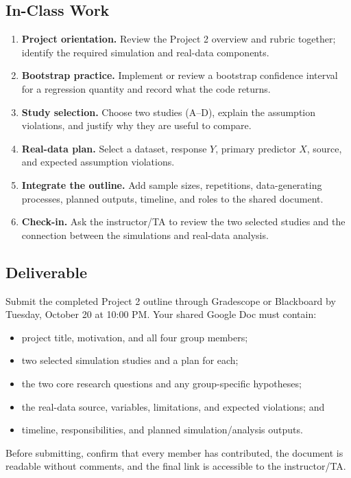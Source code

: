 \documentclass{article}
\newcommand{\submissionplatform}{Gradescope or Blackboard}
\newcommand{\duedate}{Tuesday, October 20 at 10:00 PM}
\begin{document}
\subsection*{In-Class Work}
\begin{enumerate}[label={\bfseries (\Alph*)},itemsep=.5em]
  \item \textbf{Project orientation.} Review the Project 2 overview and rubric together; identify the required simulation and real-data components.
  \item \textbf{Bootstrap practice.} Implement or review a bootstrap confidence interval for a regression quantity and record what the code returns.
  \item \textbf{Study selection.} Choose two studies (A--D), explain the assumption violations, and justify why they are useful to compare.
  \item \textbf{Real-data plan.} Select a dataset, response $Y$, primary predictor $X$, source, and expected assumption violations.
  \item \textbf{Integrate the outline.} Add sample sizes, repetitions, data-generating processes, planned outputs, timeline, and roles to the shared document.
  \item \textbf{Check-in.} Ask the instructor/TA to review the two selected studies and the connection between the simulations and real-data analysis.
\end{enumerate}

\subsection*{Deliverable}
Submit the completed Project 2 outline through \submissionplatform{} by \duedate{}. Your shared Google Doc must contain:
\begin{itemize}[itemsep=.25em]
  \item project title, motivation, and all four group members;
  \item two selected simulation studies and a plan for each;
  \item the two core research questions and any group-specific hypotheses;
  \item the real-data source, variables, limitations, and expected violations; and
  \item timeline, responsibilities, and planned simulation/analysis outputs.
\end{itemize}
Before submitting, confirm that every member has contributed, the document is readable without comments, and the final link is accessible to the instructor/TA.
\end{document}
